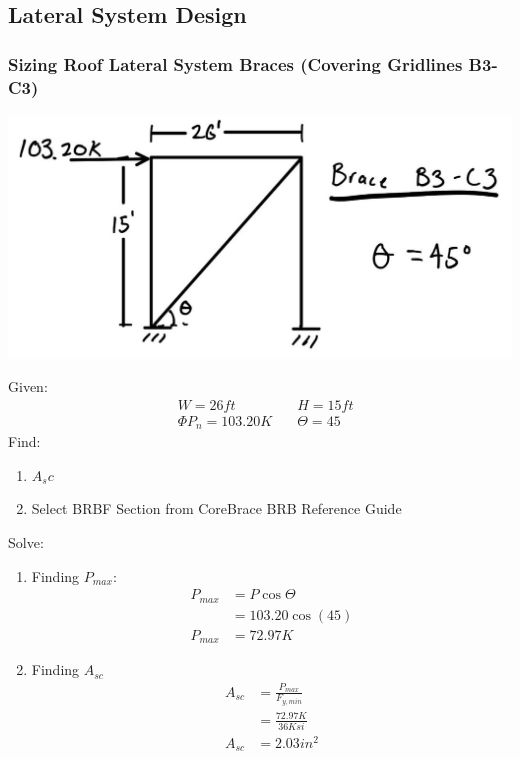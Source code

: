 \documentclass{report} %
\begin{document}
\subsection*{Lateral System Design}
\subsubsection*{Sizing Roof Lateral System Braces (Covering Gridlines B3-C3)}
\begin{center}
    \includegraphics[scale=0.15]{RoofLateralSystem_B3_C3}
\end{center}
Given:
\begin{equation*}
    \begin{aligned}
        &W = 26ft &\quad H = 15ft \\
        &\Phi P_n = 103.20K &\quad \Theta = 45
    \end{aligned}
\end{equation*}
Find: 
\begin{enumerate}
    \item $A_sc$
    \item Select BRBF Section from CoreBrace BRB Reference Guide
\end{enumerate}
Solve:
\begin{enumerate}
    \item Finding $P_{max}$:
        \begin{equation*}
            \begin{aligned}
                P_{max} &= P \cos \Theta \\
                        &= 103.20\cos(45) \\
                P_{max} &= 72.97K
            \end{aligned}
        \end{equation*}
    \item Finding $A_{sc}$
        \begin{equation*}
            \begin{aligned}
                A_{sc} &= \frac{P_{max}}{F_{y,min}} \\
                       &= \frac{72.97K}{36Ksi} \\
                A_{sc} &= 2.03in^2 
            \end{aligned}
        \end{equation*}
        \begin{center}
        \end{center}
\end{enumerate}
\end{document}
